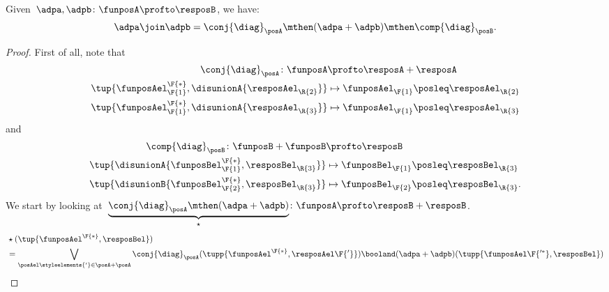 \begin{lemma}
    Given~$\adpa, \adpb\colon \funposA \profto \resposB$, we have:
    \begin{equation}
        \adpa \join \adpb =  \conj{\diag}_\posA \mthen (\adpa + \adpb)\mthen \comp{\diag}_\posB.
    \end{equation}
\end{lemma}
\begin{proof}
    First of all, note that
    \begin{equation}
        \begin{aligned}
            \conj{\diag}_\posA\colon \funposA                         & \profto \resposA+\resposA                        \\
            \tup{\funposAel_\F{1}^\F{*},\disunionA{\resposAel_\R{2}}} & \mapsto \funposAel_\F{1}\posleq \resposAel_\R{2} \\
            \tup{\funposAel_\F{1}^\F{*},\disunionA{\resposAel_\R{3}}} & \mapsto \funposAel_\F{1}\posleq \resposAel_\R{3}
        \end{aligned}
    \end{equation}
    and
    \begin{equation}
        \begin{aligned}
            \comp{\diag}_\posB\colon \funposB+\funposB                & \profto \resposB                                   \\
            \tup{\disunionA{\funposBel_\F{1}^\F{*},\resposBel_\R{3}}} & \mapsto \funposBel_\F{1}\posleq \resposBel_\R{3}   \\
            \tup{\disunionB{\funposBel_\F{2}^\F{*},\resposBel_\R{3}}} & \mapsto \funposBel_\F{2} \posleq \resposBel_\R{3}.
        \end{aligned}
    \end{equation}
    We start by looking at~$\underbrace{\conj{\diag}_\posA\mthen (\adpa+\adpb)}_{\star}\colon \funposA \profto \resposB+\resposB$.
    \begin{equation}
        \begin{aligned}
             &
            \star (\tup{\funposAel^\F{*},\resposBel})                                                                                                                                                                                                                                                                                            \\& =\bigvee_{\posAel\styleelements{'}\in \posA+\posA} \conj{\diag}_\posA(\tupp{\funposAel^\F{*},\resposAel\F{'}})\booland (\adpa+\adpb)(\tupp{\funposAel\F{'^*},\resposBel})                                                                                                                                                         \\

\end{aligned}
\end{equation}
\end{proof}
